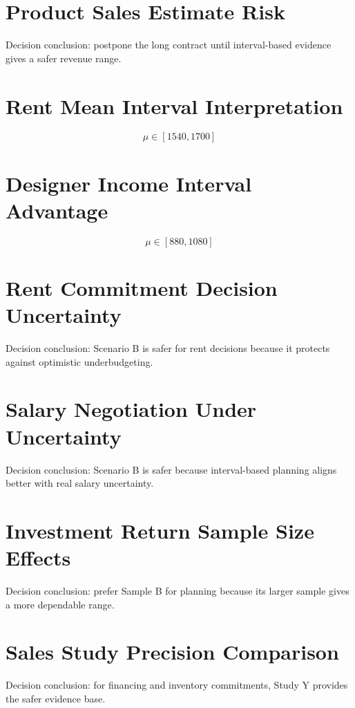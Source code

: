 \section*{Product Sales Estimate Risk}
Decision conclusion: postpone the long contract until interval-based evidence gives a safer revenue range.

\section*{Rent Mean Interval Interpretation}
\[\mu \in [1540,1700]\]

\section*{Designer Income Interval Advantage}
\[\mu \in [880,1080]\]

\section*{Rent Commitment Decision Uncertainty}
Decision conclusion: Scenario B is safer for rent decisions because it protects against optimistic underbudgeting.

\section*{Salary Negotiation Under Uncertainty}
Decision conclusion: Scenario B is safer because interval-based planning aligns better with real salary uncertainty.

\section*{Investment Return Sample Size Effects}
Decision conclusion: prefer Sample B for planning because its larger sample gives a more dependable range.

\section*{Sales Study Precision Comparison}
Decision conclusion: for financing and inventory commitments, Study Y provides the safer evidence base.


